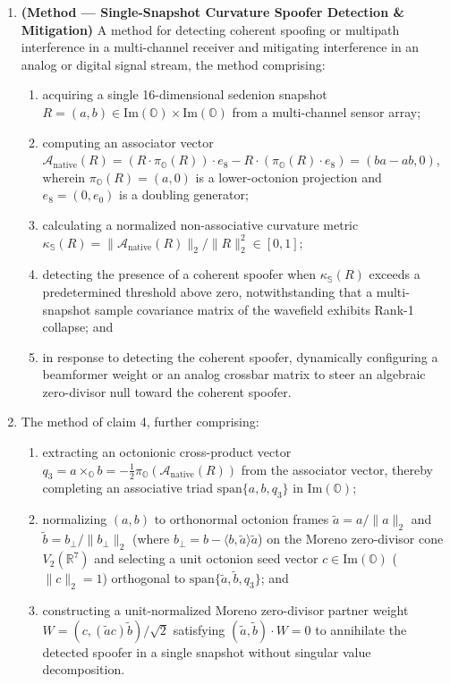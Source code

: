\documentclass[12pt,letterpaper]{article}
\begin{document}
\begin{enumerate}[leftmargin=20pt,itemsep=4pt]
    \item \textbf{(Method --- Single-Snapshot Curvature Spoofer Detection \& Mitigation)} A method for detecting coherent spoofing or multipath interference in a multi-channel receiver and mitigating interference in an analog or digital signal stream, the method comprising:
    \begin{enumerate}[leftmargin=16pt,itemsep=1pt]
        \item acquiring a single 16-dimensional sedenion snapshot $R = (a, b) \in \mathrm{Im}(\mathbb{O}) \times \mathrm{Im}(\mathbb{O})$ from a multi-channel sensor array;
        \item computing an associator vector $\mathcal{A}_{\mathrm{native}}(R) = (R \cdot \pi_{\mathbb{O}}(R)) \cdot e_8 - R \cdot (\pi_{\mathbb{O}}(R) \cdot e_8) = (ba - ab, 0)$, wherein $\pi_{\mathbb{O}}(R) = (a, 0)$ is a lower-octonion projection and $e_8 = (0, e_0)$ is a doubling generator;
        \item calculating a normalized non-associative curvature metric $\kappa_{\mathbb{S}}(R) = \|\mathcal{A}_{\mathrm{native}}(R)\|_2 / \|R\|_2^2 \in [0, 1]$;
        \item detecting the presence of a coherent spoofer when $\kappa_{\mathbb{S}}(R)$ exceeds a predetermined threshold above zero, notwithstanding that a multi-snapshot sample covariance matrix of the wavefield exhibits Rank-1 collapse; and
        \item in response to detecting the coherent spoofer, dynamically configuring a beamformer weight or an analog crossbar matrix to steer an algebraic zero-divisor null toward the coherent spoofer.
    \end{enumerate}

    \item The method of claim 4, further comprising:
    \begin{enumerate}[leftmargin=16pt,itemsep=1pt]
        \item extracting an octonionic cross-product vector $q_3 = a \times_{\mathbb{O}} b = -\frac{1}{2}\pi_{\mathbb{O}}(\mathcal{A}_{\mathrm{native}}(R))$ from the associator vector, thereby completing an associative triad $\mathrm{span}\{a, b, q_3\}$ in $\mathrm{Im}(\mathbb{O})$;
        \item normalizing $(a, b)$ to orthonormal octonion frames $\tilde{a} = a/\|a\|_2$ and $\tilde{b} = b_\perp / \|b_\perp\|_2$ (where $b_\perp = b - \langle b, \tilde{a}\rangle\tilde{a}$) on the Moreno zero-divisor cone $V_2(\mathbb{R}^7)$ and selecting a unit octonion seed vector $c \in \mathrm{Im}(\mathbb{O})$ ($\|c\|_2 = 1$) orthogonal to $\mathrm{span}\{\tilde{a}, \tilde{b}, q_3\}$; and
        \item constructing a unit-normalized Moreno zero-divisor partner weight $W = (c, (\tilde{a}c)\tilde{b})/\sqrt{2}$ satisfying $(\tilde{a}, \tilde{b}) \cdot W = 0$ to annihilate the detected spoofer in a single snapshot without singular value decomposition.
    \end{enumerate}


\end{enumerate}
\end{document}
